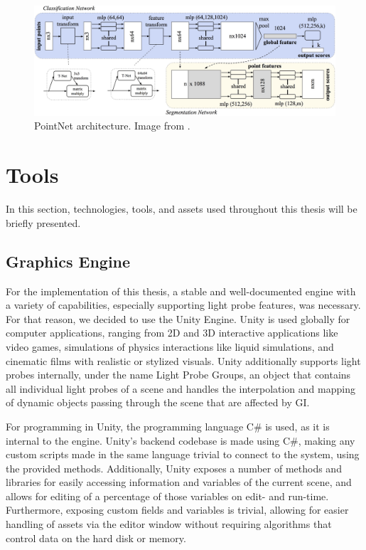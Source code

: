 \begin{figure}[h]
	\centering
	\includegraphics[width=\linewidth]{Graphics/pointnet.jpg}
	\caption{PointNet architecture. Image from \cite{PointNet2017}.}
	\label{fig:pointnet}
\end{figure}

\section{Tools} %
In this section, technologies, tools, and assets used throughout this thesis will be briefly presented.

\subsection{Graphics Engine}
For the implementation of this thesis, a stable and well-documented engine with a variety of capabilities, especially supporting light probe features, was necessary. For that reason, we decided to use the Unity Engine. Unity is used globally for computer applications, ranging from 2D and 3D interactive applications like video games, simulations of physics interactions like liquid simulations, and cinematic films with realistic or stylized visuals. Unity additionally supports light probes internally, under the name Light Probe Groups, an object that contains all individual light probes of a scene and handles the interpolation and mapping of dynamic objects passing through the scene that are affected by GI.

For programming in Unity, the programming language C\# is used, as it is internal to the engine. Unity's backend codebase is made using C\#, making any custom scripts made in the same language trivial to connect to the system, using the provided methods. Additionally, Unity exposes a number of methods and libraries for easily accessing information and variables of the current scene, and allows for editing of a percentage of those variables on edit- and run-time. Furthermore, exposing custom fields and variables is trivial, allowing for easier handling of assets via the editor window without requiring algorithms that control data on the hard disk or memory.

